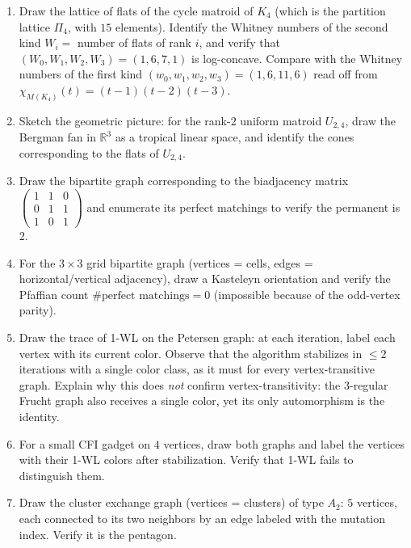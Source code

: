 \begin{enumerate}[resume]
\item Draw the lattice of flats of the cycle matroid of $K_4$ (which is
the partition lattice $\Pi_4$, with $15$ elements). Identify the
Whitney numbers of the second kind $W_i = $ number of flats of rank
$i$, and verify that $(W_0, W_1, W_2, W_3) = (1, 6, 7, 1)$ is
log-concave. Compare with the Whitney numbers of the first kind
$(w_0, w_1, w_2, w_3) = (1, 6, 11, 6)$ read off from
$\chi_{M(K_4)}(t) = (t - 1)(t - 2)(t - 3)$.

\item Sketch the geometric picture: for the rank-$2$ uniform matroid
$U_{2, 4}$, draw the Bergman fan in $\mathbb R^3$ as a tropical
linear space, and identify the cones corresponding to the flats of
$U_{2, 4}$.

\item Draw the bipartite graph corresponding to the biadjacency matrix
$\begin{pmatrix} 1 & 1 & 0 \\ 0 & 1 & 1 \\ 1 & 0 & 1 \end{pmatrix}$
and enumerate its perfect matchings to verify the permanent is $2$.

\item For the $3 \times 3$ grid bipartite graph (vertices = cells,
edges = horizontal/vertical adjacency), draw a Kasteleyn orientation
and verify the Pfaffian count $\#\text{perfect matchings} = 0$
(impossible because of the odd-vertex parity).

\item Draw the trace of 1-WL on the Petersen graph: at each iteration, label
each vertex with its current color. Observe that the algorithm
stabilizes in $\le 2$ iterations with a single color class, as it must
for every vertex-transitive graph. Explain why this does \emph{not}
confirm vertex-transitivity: the $3$-regular Frucht graph also receives
a single color, yet its only automorphism is the identity.

\item For a small CFI gadget on $4$ vertices, draw both graphs and label
the vertices with their 1-WL colors after stabilization. Verify
that 1-WL fails to distinguish them.

\item Draw the cluster exchange graph (vertices = clusters) of type $A_2$:
$5$ vertices, each connected to its two neighbors by an edge labeled
with the mutation index. Verify it is the pentagon.


\end{enumerate}
